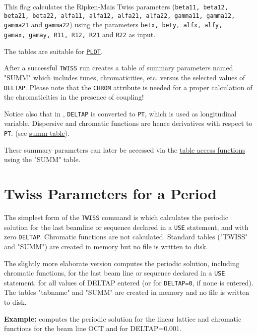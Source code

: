 \begin{madlist}
   This flag calculates the Ripken-Mais Twiss
  parameters (\texttt{beta11, beta12, beta21, beta22, alfa11, alfa12,
  alfa21, alfa22, gamma11, gamma12, gamma21} and \texttt{gamma22}) using
  the parameters \texttt{betx, bety, alfx, alfy, \\ gamax, gamay, R11, R12,
    R21} and \texttt{R22} as input.  

\end{madlist}

The tables are suitable for \hyperref[chap:plot]{\texttt{PLOT}}.

After a successful \texttt{TWISS} run \madx creates a 
table of summary parameters named "SUMM" which includes tunes,
chromaticities, etc. versus the selected values of \texttt{DELTAP}.
Please note that the \texttt{CHROM} attribute is needed
for a proper calculation of the chromaticities in the presence of
coupling!

Notice also that in \madx, \texttt{DELTAP} is converted to \texttt{PT},
which is used as longitudinal variable. 
Dispersive and chromatic functions are hence derivatives with
respect to \texttt{PT}. (see \hyperref[subsec:tables-summ]{summ table}). 

These summary parameters can later be accessed via the 
\hyperref[chap:tables]{table access functions} using the "SUMM" table.  

\section{Twiss Parameters for a Period}
\label{sec:twissperiod}

The simplest form of the \texttt{TWISS} command is
which calculates the periodic solution for the last beamline or sequence
declared in a \texttt{USE} statement, and with zero \texttt{DELTAP}.
Chromatic functions are not calculated. 
Standard tables ("TWISS" and "SUMM") are created in memory but no file
is written to disk. 

The slightly more elaborate version 
computes the periodic solution, including chromatic functions, for the last beam
line or sequence declared in a \texttt{USE} statement, for all values of
DELTAP entered (or for \texttt{DELTAP=0}, if none is entered). 
The tables "tabname" and "SUMM" are created in memory and no file is
written to disk. 

\textbf{Example:} 
computes the periodic solution for the linear lattice and
chromatic functions for the beam line OCT and for DELTAP=0.001. 


